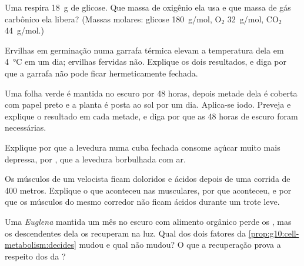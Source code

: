 \begin{exercise}[$\star\star$]\label{exo:g10:cell-metabolism:8}
Uma  respira \qty{18}{g} de glicose. Que massa de oxigênio ela
usa e que massa de gás carbônico ela libera? (Massas molares: glicose
\qty{180}{g/mol}, $\mathrm{O_2}$ \qty{32}{g/mol},
$\mathrm{CO_2}$ \qty{44}{g/mol}.)
\end{exercise}

\begin{exercise}[$\star\star$]\label{exo:g10:cell-metabolism:9}
Ervilhas em germinação numa garrafa térmica elevam a temperatura dela
em \qty{4}{\celsius} em um dia; ervilhas fervidas não. Explique os dois
resultados, e diga por que a garrafa não pode ficar hermeticamente
fechada.
\end{exercise}

\begin{exercise}[$\star\star$]\label{exo:g10:cell-metabolism:10}
Uma folha verde é mantida no escuro por 48 horas, depois metade dela é
coberta com papel preto e a planta é posta ao sol por um dia. Aplica-se
iodo. Preveja e explique o resultado em cada metade, e diga por que as
48 horas de escuro foram necessárias.
\end{exercise}

\begin{exercise}[$\star\star$]\label{exo:g10:cell-metabolism:11}
Explique por que a levedura numa cuba fechada consome açúcar muito mais
depressa, por , que a levedura borbulhada com ar.
\end{exercise}

\begin{exercise}[$\star\star\star$]\label{exo:g10:cell-metabolism:12}
Os músculos de um velocista ficam doloridos e ácidos depois de uma
corrida de 400 metros. Explique o que aconteceu nas  musculares,
por que aconteceu, e por que os músculos do mesmo corredor não ficam
ácidos durante um trote leve.
\end{exercise}

\begin{exercise}[$\star\star\star$]\label{exo:g10:cell-metabolism:13}
Uma \emph{Euglena} mantida um mês no escuro com alimento orgânico perde
os , mas os descendentes dela os recuperam na luz. Qual dos
dois fatores da \cref{prop:g10:cell-metabolism:decides} mudou e qual
não mudou? O que a recuperação prova a respeito dos  da ?
\end{exercise}

